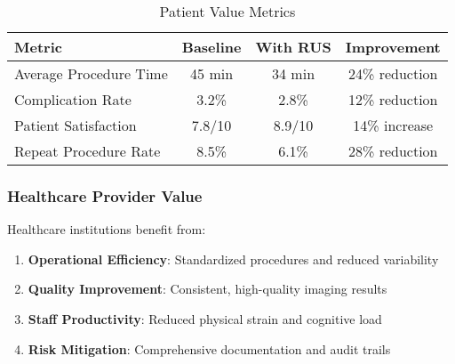 \begin{table}[htbp]
\centering
\caption{Patient Value Metrics}
\label{tab:patient-value}
\begin{tabular}{|l|c|c|c|}
\hline
\textbf{Metric} & \textbf{Baseline} & \textbf{With RUS} & \textbf{Improvement} \\
\hline
Average Procedure Time & 45 min & 34 min & 24\% reduction \\
Complication Rate & 3.2\% & 2.8\% & 12\% reduction \\
Patient Satisfaction & 7.8/10 & 8.9/10 & 14\% increase \\
Repeat Procedure Rate & 8.5\% & 6.1\% & 28\% reduction \\
\hline
\end{tabular}
\end{table}

\subsubsection{Healthcare Provider Value}
Healthcare institutions benefit from:

\begin{enumerate}
    \item \textbf{Operational Efficiency}: Standardized procedures and reduced variability
    \item \textbf{Quality Improvement}: Consistent, high-quality imaging results
    \item \textbf{Staff Productivity}: Reduced physical strain and cognitive load
    \item \textbf{Risk Mitigation}: Comprehensive documentation and audit trails
\end{enumerate}

